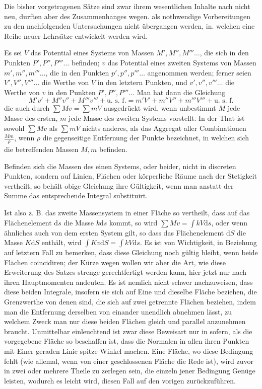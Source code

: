 %
Die bisher vorgetragenen Sätze sind zwar ihrem wesentlichen Inhalte nach nicht neu, durften aber des Zusammenhanges wegen. als nothwendige Vorbereitungen zu den nachfolgenden Untersuchungen nicht übergangen werden, in. welchen eine Reihe neuer Lehrsätze entwickelt werden wird.

Es sei $V$ das Potential eines Systems von Massen $M',M'',M'''\ldots$, die sich in den Punkten $P',P'',P'''\ldots$ befinden; $v$ das Potential eines zweiten Systems von Massen $m',m'',m'''\ldots$, die in den Punkten $p',p'',p'''\ldots$ angenommen werden; ferner seien $V',V'',V'''\ldots$ die Werthe von $V$ in den letztern Punkten, und $v',v'',v'''\ldots$ die Werthe von $v$ in den Punkten $P',P'',P'''\ldots$ Man hat dann die Gleichung
\[
M'v'+M''v''+M'''v'''+\text{u. s. f.}=m'V'+m''V''+m'''V'''+\text{u. s. f.}
\]
die auch durch $\sum Mv=\sum mV$ ausgedrückt wird, wenn unbestimmt $M$ jede Masse des ersten, $m$ jede Masse des zweiten Systems vorstellt. In der That ist sowohl $\sum Mv$ als $\sum mV$ nichts anderes, als das Aggregat aller Combinationen $\frac{Mm}{\rho}$, wenn $\rho$ die gegenseitige Entfernung der Punkte bezeichnet, in welchen sich die betreffenden Massen $M,m$ befinden.

Befinden sich die Massen des einen Systems, oder beider, nicht in discreten Punkten, sondern auf Linien, Flächen oder körperliche Räume nach der Stetigkeit vertheilt, so behält obige Gleichung ihre Gültigkeit, wenn man anstatt der Summe das entsprechende Integral substituirt.

Ist also z. B. das zweite Massensystem in einer Fläche so vertheilt, dass auf das Flächenelement $\mathrm ds$ die Masse $k\mathrm ds$ kommt, so wird $\sum Mv=\int kV\mathrm ds$, oder wenn ähnliches auch von dem ersten System gilt, so dass das Flächenelement $\mathrm dS$ die Masse $K\mathrm dS$ enthält, wird $\int Kv\mathrm dS=\int kV\mathrm ds$. Es ist von Wichtigkeit, in Beziehung auf letztern Fall zu bemerken, dass diese Gleichung noch gültig bleibt, wenn beide Flächen coincidiren; der Kürze wegen wollen wir aber die Art, wie diese Erweiterung des Satzes strenge gerechtfertigt werden kann, hier jetzt nur nach ihren Hauptmomenten andeuten. Es ist nemlich nicht schwer nachzuweisen, dass diese beiden Integrale, insofern sie sich auf Eine und dieselbe Fläche beziehen, die Grenzwerthe von denen sind, die sich auf zwei getrennte Flächen
%
beziehen, indem man die Entfernung derselben von einander unendlich abnehmen lässt, zu welchem Zweck man nur diese beiden Flächen gleich und parallel anzunehmen braucht. Unmittelbar einleuchtend ist zwar diese Beweisart nur in sofern, als die vorgegebene Fläche so beschaffen ist, dass die Normalen in allen ihren Punkten mit Einer geraden Linie spitze Winkel machen. Eine Fläche, wo diese Bedingung fehlt (wie allemal, wenn von einer geschlossenen Fläche die Rede ist), wird zuvor in zwei oder mehrere Theile zu zerlegen sein, die einzeln jener Bedingung Genüge leisten, wodurch es leicht wird, diesen Fall auf den vorigen zurückzuführen.

